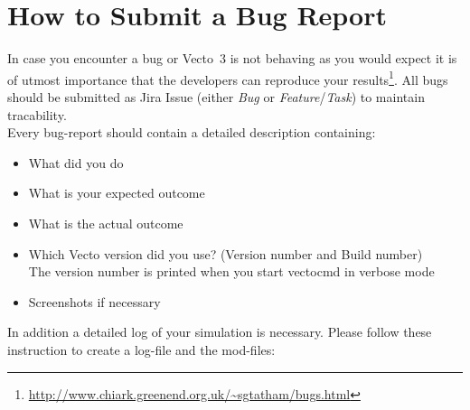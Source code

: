 

\section{How to Submit a Bug Report} %
\label{sec:how_to_submit_a_bug_report}

In case you encounter a bug or Vecto~3 is not behaving as you would expect it is of utmost importance that the developers can reproduce your results\footnote{\url{http://www.chiark.greenend.org.uk/~sgtatham/bugs.html}}. All bugs should be submitted as Jira Issue (either \textit{Bug} or \textit{Feature}/\textit{Task}) to maintain tracability. \\[0.5em]

Every bug-report should contain a detailed description containing:
\begin{itemize}
	\item What did you do
	\item What is your expected outcome
	\item What is the actual outcome
	\item Which Vecto version did you use? (Version number and Build number) \\
		The version number is printed when you start vectocmd in verbose mode
	\item Screenshots if necessary
\end{itemize}

In addition a detailed log of your simulation is necessary. Please follow these instruction to create a log-file and the mod-files:

